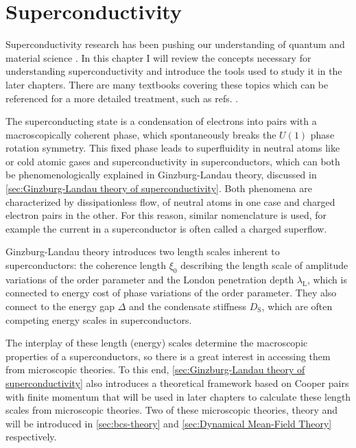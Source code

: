\documentclass[../notes.tex]{subfiles}
\begin{document}
\raggedbottom

\chapter{Superconductivity}\label{ch:superconductivity}

Superconductivity research has been pushing our understanding of quantum and material science \cite{keimerPhysicsQuantumMaterials2017}.
In this chapter I will review the concepts necessary for understanding superconductivity and introduce the tools used to study it in the later chapters.
There are many textbooks covering these topics which can be referenced for a more detailed treatment, such as refs. \cite{colemanIntroductionManyBodyPhysics2015, tinkhamIntroductionSuperconductivity1996, bruusManyBodyQuantumTheory2004, larkinTheoryFluctuationsSuperconductors2005, bennemannSuperconductivity2008}.

The superconducting state is a condensation of electrons into pairs with a macroscopically coherent phase, which spontaneously breaks the \(U(1)\) phase rotation symmetry.
This fixed phase leads to superfluidity in neutral atoms like  or cold atomic gases and superconductivity in superconductors, which can both be phenomenologically explained in Ginzburg-Landau theory, discussed in \cref{sec:Ginzburg-Landau theory of superconductivity}.
Both phenomena are characterized by dissipationless flow, of neutral atoms in one case and charged electron pairs in the other.
For this reason, similar nomenclature is used, for example the current in a superconductor is often called a charged superflow.

Ginzburg-Landau theory introduces two length scales inherent to superconductors: the coherence length \(\xi_0\) describing the length scale of amplitude variations of the order parameter and the London penetration depth \(\lambda_{\mathrm{L}}\), which is connected to energy cost of phase variations of the order parameter.
They also connect to the energy gap \(\Delta\) and the condensate stiffness \(D_{\mathrm{S}}\), which are often competing energy scales in superconductors.

The interplay of these length (energy) scales determine the macroscopic properties of a superconductors, so there is a great interest in accessing them from microscopic theories.
To this end, \cref{sec:Ginzburg-Landau theory of superconductivity} also introduces a theoretical framework based on Cooper pairs with finite momentum \cite{wittBypassingLatticeBCS2024} that will be used in later chapters to calculate these length scales from microscopic theories.
Two of these microscopic theories,  theory and  will be introduced in \cref{sec:bcs-theory} and \cref{sec:Dynamical Mean-Field Theory} respectively.
\end{document}
